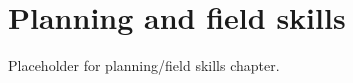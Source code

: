 \setchapterpreamble[u]{\margintoc}
\chapter{\color{gray} Planning and field skills \color{black}}

Placeholder for planning/field skills chapter.
